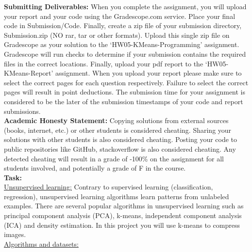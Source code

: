 \documentclass[11pt]{article}
\begin{document}
\textbf{Submitting Deliverables:}
When you complete the assignment, you will upload your report and your code using the Gradescope.com service. Place your final code in Submission/Code.  Finally, create a zip file of your submission directory, Submission.zip (NO rar, tar or other formats). Upload this single zip file on Gradescope as your solution to the `HW05-KMeans-Programming' assignment. Gradescope will run checks to determine if your submission contains the required files in the correct locations. Finally, upload your pdf report to the `HW05-KMeans-Report' assignment. When you upload your report please make sure to select the correct pages for each question respectively. Failure to select the correct pages will result in point deductions. The submission time for your assignment is considered to be the later of the submission timestamps of your code and report submissions.\\

\textbf{Academic Honesty Statement:} Copying solutions from external sources (books, internet, etc.) or other students is considered cheating. Sharing your solutions with other students is also considered cheating. Posting your code to public repositories like GitHub, stackoverflow is also considered cheating. Any detected cheating will result in a grade of -100\% on the assignment for all students involved, and potentially a grade of F in the course.\\

\textbf{Task:} \\

\underline{Unsupervised learning:} Contrary to supervised learning (classification, regression), unsupervised learning algorithms learn patterns from unlabeled examples. There are several popular algorithms in unsupervised learning such as principal component analysis (PCA), k-means, independent component analysis (ICA) and density estimation. In this project you will use k-means to compress images.\\

\underline{Algorithms and datasets: }
\end{document}
